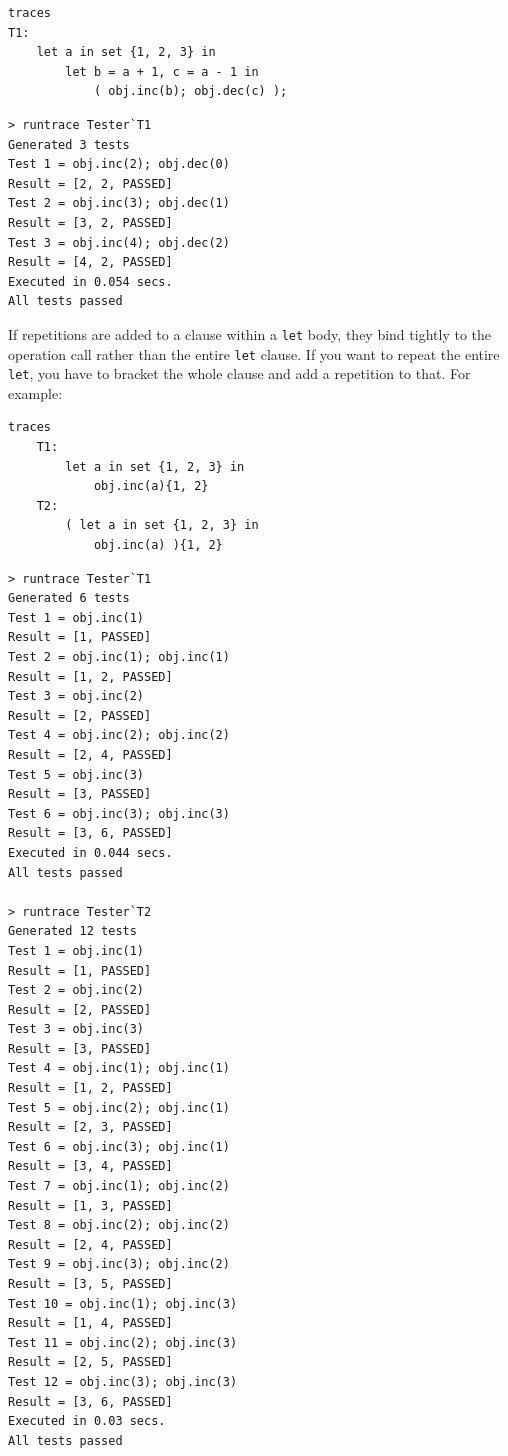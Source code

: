 \documentclass{overturerepchap}
\begin{document}
\small
\begin{lstlisting}
traces
T1:
    let a in set {1, 2, 3} in
        let b = a + 1, c = a - 1 in
            ( obj.inc(b); obj.dec(c) );
\end{lstlisting}

\begin{verbatim}
> runtrace Tester`T1
Generated 3 tests
Test 1 = obj.inc(2); obj.dec(0)
Result = [2, 2, PASSED]
Test 2 = obj.inc(3); obj.dec(1)
Result = [3, 2, PASSED]
Test 3 = obj.inc(4); obj.dec(2)
Result = [4, 2, PASSED]
Executed in 0.054 secs. 
All tests passed
\end{verbatim}
\normalsize

If repetitions are added to a clause within a \texttt{let} body, they bind
tightly to the operation call rather than the entire \texttt{let} clause.
If you want to repeat the entire \texttt{let}, you have to
bracket the whole clause and add a repetition to that. For example:

\small
\begin{lstlisting}
traces
    T1:
        let a in set {1, 2, 3} in
            obj.inc(a){1, 2}
    T2:
        ( let a in set {1, 2, 3} in
            obj.inc(a) ){1, 2}
\end{lstlisting}

\begin{verbatim}
> runtrace Tester`T1
Generated 6 tests
Test 1 = obj.inc(1)
Result = [1, PASSED]
Test 2 = obj.inc(1); obj.inc(1)
Result = [1, 2, PASSED]
Test 3 = obj.inc(2)
Result = [2, PASSED]
Test 4 = obj.inc(2); obj.inc(2)
Result = [2, 4, PASSED]
Test 5 = obj.inc(3)
Result = [3, PASSED]
Test 6 = obj.inc(3); obj.inc(3)
Result = [3, 6, PASSED]
Executed in 0.044 secs. 
All tests passed

> runtrace Tester`T2
Generated 12 tests
Test 1 = obj.inc(1)
Result = [1, PASSED]
Test 2 = obj.inc(2)
Result = [2, PASSED]
Test 3 = obj.inc(3)
Result = [3, PASSED]
Test 4 = obj.inc(1); obj.inc(1)
Result = [1, 2, PASSED]
Test 5 = obj.inc(2); obj.inc(1)
Result = [2, 3, PASSED]
Test 6 = obj.inc(3); obj.inc(1)
Result = [3, 4, PASSED]
Test 7 = obj.inc(1); obj.inc(2)
Result = [1, 3, PASSED]
Test 8 = obj.inc(2); obj.inc(2)
Result = [2, 4, PASSED]
Test 9 = obj.inc(3); obj.inc(2)
Result = [3, 5, PASSED]
Test 10 = obj.inc(1); obj.inc(3)
Result = [1, 4, PASSED]
Test 11 = obj.inc(2); obj.inc(3)
Result = [2, 5, PASSED]
Test 12 = obj.inc(3); obj.inc(3)
Result = [3, 6, PASSED]
Executed in 0.03 secs. 
All tests passed
\end{verbatim}
\normalsize
\end{document}
